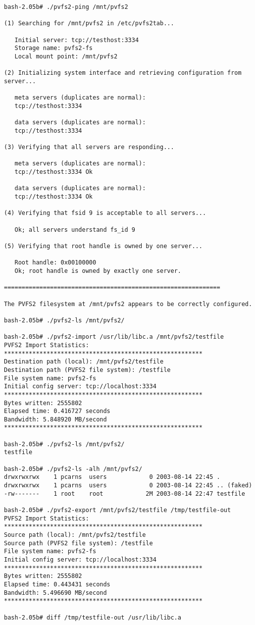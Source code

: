 \documentclass[11pt, letterpaper]{article}
\begin{document}
\begin{verbatim}
bash-2.05b# ./pvfs2-ping /mnt/pvfs2

(1) Searching for /mnt/pvfs2 in /etc/pvfs2tab...

   Initial server: tcp://testhost:3334
   Storage name: pvfs2-fs
   Local mount point: /mnt/pvfs2

(2) Initializing system interface and retrieving configuration from server...

   meta servers (duplicates are normal):
   tcp://testhost:3334

   data servers (duplicates are normal):
   tcp://testhost:3334

(3) Verifying that all servers are responding...

   meta servers (duplicates are normal):
   tcp://testhost:3334 Ok

   data servers (duplicates are normal):
   tcp://testhost:3334 Ok

(4) Verifying that fsid 9 is acceptable to all servers...

   Ok; all servers understand fs_id 9

(5) Verifying that root handle is owned by one server...

   Root handle: 0x00100000
   Ok; root handle is owned by exactly one server.

=============================================================

The PVFS2 filesystem at /mnt/pvfs2 appears to be correctly configured.

bash-2.05b# ./pvfs2-ls /mnt/pvfs2/

bash-2.05b# ./pvfs2-import /usr/lib/libc.a /mnt/pvfs2/testfile
PVFS2 Import Statistics:
********************************************************
Destination path (local): /mnt/pvfs2/testfile
Destination path (PVFS2 file system): /testfile
File system name: pvfs2-fs
Initial config server: tcp://localhost:3334
********************************************************
Bytes written: 2555802
Elapsed time: 0.416727 seconds
Bandwidth: 5.848920 MB/second
********************************************************

bash-2.05b# ./pvfs2-ls /mnt/pvfs2/
testfile

bash-2.05b# ./pvfs2-ls -alh /mnt/pvfs2/
drwxrwxrwx    1 pcarns  users            0 2003-08-14 22:45 .
drwxrwxrwx    1 pcarns  users            0 2003-08-14 22:45 .. (faked)
-rw-------    1 root    root            2M 2003-08-14 22:47 testfile

bash-2.05b# ./pvfs2-export /mnt/pvfs2/testfile /tmp/testfile-out
PVFS2 Import Statistics:
********************************************************
Source path (local): /mnt/pvfs2/testfile
Source path (PVFS2 file system): /testfile
File system name: pvfs2-fs
Initial config server: tcp://localhost:3334
********************************************************
Bytes written: 2555802
Elapsed time: 0.443431 seconds
Bandwidth: 5.496690 MB/second
********************************************************

bash-2.05b# diff /tmp/testfile-out /usr/lib/libc.a
\end{verbatim}
\end{document}
